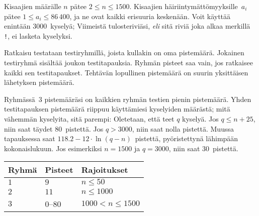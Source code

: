 Kisaajien määrälle $n$ pätee 
$2\leq n\leq 1500$. %
Kisaajien häiriintymättömyyksille~$a_i$ pätee
$1\leq a_i\leq 86\,400$, %
ja ne ovat kaikki erisuuria keskenään. %
Voit käyttää enintään $3000$~kyselyä; %
Viimeistä tulosteriviäsi, \emph{eli} sitä riviä joka alkaa merkillä \texttt{!},
ei lasketa kyselyksi.

Ratkaisu testataan testiryhmillä, joista kullakin on oma pistemäärä.
Jokainen testiryhmä sisältää joukon testitapauksia.
Ryhmän pisteet saa vain, jos ratkaisee kaikki sen testitapaukset.
Tehtävän lopullinen pistemäärä on suurin yksittäisen lähetyksen pistemäärä.

Ryhmässä~$3$ pistemääräsi on kaikkien ryhmän testien pienin pistemäärä.
Yhden testitapauksen pistemäärä riippuu käyttämiesi kyselyiden määrästä; 
mitä vähemmän kyselyita, sitä parempi:
Oletetaan, että teet $q$ kyselyä.
Jos $q \le n+25$, niin saat täydet $80$~pistettä. 
Jos $q > 3000$, niin saat nolla pistettä.
Muussa tapauksessa saat $118.2 - 12 \cdot \ln(q - n)$~pistettä, 
pyöristettynä lähimpään kokonaislukuun. %
Jos esimerkiksi $n = 1500$ ja $q = 3000$, niin saat $30$~pistettä.

\medskip
\begin{tabular}{lll}
Ryhmä & Pisteet & Rajoitukset\\\hline
$1$  &  $9$ & $n\leq 50$\\
$2$  &  $11$ & $n\leq 1000$\\
$3$  &  $0$--$80$ & $1000 < n\leq 1500$\\
\end{tabular}

